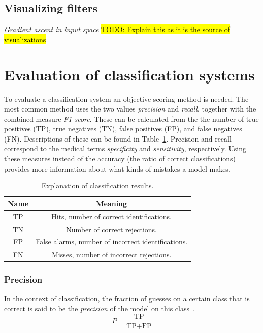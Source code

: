 \documentclass{kththesis}
\begin{document}
\subsection{Visualizing filters}
\textit{Gradient ascent in input space}
\hl{TODO: Explain this as it is the source of visualizations}

\section{Evaluation of classification systems}
To evaluate a classification system an objective scoring method is needed. The most common method uses the two values \textit{precision} and \textit{recall}, together with the combined measure \textit{F1-score}. These can be calculated from the the number of true positives (TP), true negatives (TN), false positives (FP), and false negatives (FN). Descriptions of these can be found in Table~\ref{tab:tp_mm}. Precision and recall correspond to the medical terms \textit{specificity} and \textit{sensitivity}, respectively. Using these measures instead of the accuracy (the ratio of correct classifications) provides more information about what kinds of mistakes a model makes.

\begin{table}[H]
  \begin{center}
    \begin{tabular}{cc}
      \textbf{Name} & \textbf{Meaning} \\
      \toprule
      TP & Hits, number of correct identifications. \\
      TN & Number of correct rejections. \\
      FP & False alarms, number of incorrect identifications. \\
      FN & Misses, number of incorrect rejections.
    \end{tabular}
  \end{center}
  \caption{Explanation of classification results.}
  \label{tab:tp_mm}
\end{table}

\subsubsection{Precision}
In the context of classification, the fraction of guesses on a certain class that is correct is said to be the \textit{precision} of the model on this class~\cite[p.~5]{irbook}.
\[ P = \frac{\text{TP}}{\text{TP} + \text{FP}} \]
\end{document}
